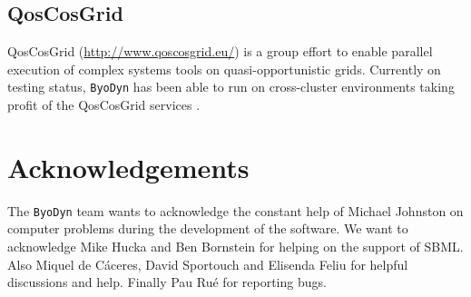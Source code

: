 \documentclass[a4paper, 11pt]{article}
\begin{document}
\subsection{QosCosGrid}
QosCosGrid (\url{http://www.qoscosgrid.eu/}) is a group effort to enable parallel execution of complex systems tools on quasi-opportunistic grids.
Currently on testing status, \texttt{ByoDyn} has been able to run on cross-cluster environments taking profit of the QosCosGrid services \citep{coti08}.
\section{Acknowledgements}
The \texttt{ByoDyn} team wants to acknowledge the constant help of Michael Johnston on computer problems during the development of the software.
We want to acknowledge Mike Hucka and Ben Bornstein for helping on the support of SBML.
Also Miquel de C\'aceres, David Sportouch and Elisenda Feliu for helpful discussions and help.
Finally Pau Ru\'e for reporting bugs.


\end{document}
